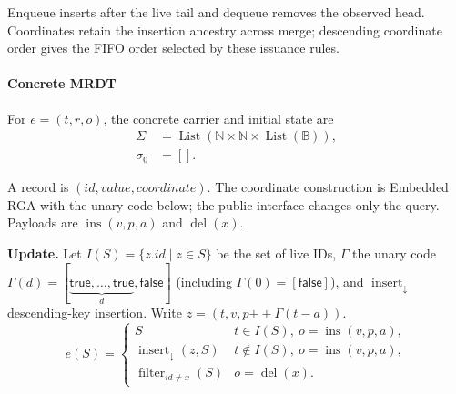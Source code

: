 







Enqueue inserts after the live tail and dequeue removes the observed head. Coordinates retain the insertion ancestry across merge; descending coordinate order gives the FIFO order selected by these issuance rules.

\paragraph{Concrete MRDT}
For $e=(t,r,o)$, the concrete carrier and initial state are
\[
\begin{aligned}\Sigma&=\operatorname{List}(\mathbb N\times\mathbb N\times\operatorname{List}(\mathbb B)),\\\sigma_0&=[].\end{aligned}
\]

A record is $(id,value,coordinate)$. The coordinate construction is Embedded RGA with the unary code below; the public interface changes only the query. Payloads are $\operatorname{ins}(v,p,a)$ and $\operatorname{del}(x)$.

\textbf{Update.} Let $I(S)=\{z.id\mid z\in S\}$ be the set of live IDs, $\Gamma$ the unary code $\Gamma(d)=[\underbrace{\mathsf{true},\ldots,\mathsf{true}}_{d},\mathsf{false}]$ (including $\Gamma(0)=[\mathsf{false}]$), and $\operatorname{insert}_{\downarrow}$ descending-key insertion. Write $z=(t,v,p\mathbin{+\!+}\Gamma(t-a))$.
\[
e(S)=\begin{cases}S&t\in I(S),\ o=\operatorname{ins}(v,p,a),\\\operatorname{insert}_{\downarrow}(z,S)&t\notin I(S),\ o=\operatorname{ins}(v,p,a),\\\operatorname{filter}_{id\ne x}(S)&o=\operatorname{del}(x).\end{cases}
\]

